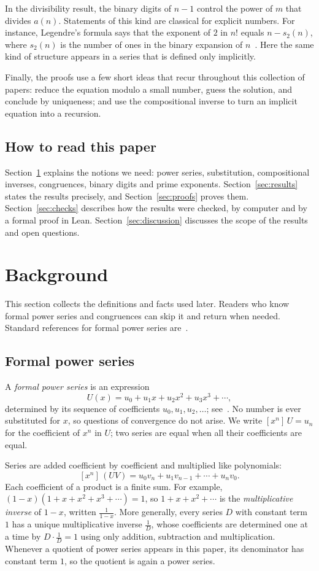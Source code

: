\documentclass[11pt,a4paper]{article}
\theoremstyle{definition}
\theoremstyle{remark}
\newcommand{\coeff}[2]{[x^{#1}]\,#2}
\begin{document}
In the divisibility result, the binary digits of $n-1$ control the power of $m$ that divides $a(n)$. Statements of
this kind are classical for explicit numbers. For instance, Legendre's formula says that the exponent of $2$
in $n!$ equals $n-s_2(n)$, where $s_2(n)$ is the number of ones in the binary expansion of $n$~\cite{concrete}.
Here the same kind of structure appears in a series that is defined only implicitly.

Finally, the proofs use a few short ideas that recur throughout this collection of papers: reduce the equation modulo
a small number, guess the solution, and conclude by uniqueness; and use the compositional inverse to turn an implicit
equation into a recursion.

\subsection{How to read this paper}
Section~\ref{sec:background} explains the notions we need: power series, substitution, compositional inverses,
congruences, binary digits and prime exponents. Section~\ref{sec:results} states the results precisely, and
Section~\ref{sec:proofs} proves them. Section~\ref{sec:checks} describes how the results were checked, by computer and by
a formal proof in Lean. Section~\ref{sec:discussion} discusses the scope of the results and open questions.
\section{Background}\label{sec:background}
This section collects the definitions and facts used later. Readers who know formal power series and congruences can skip it and return when needed. Standard references for formal power series are~\cite{niven,stanley}.
\subsection{Formal power series}
A \emph{formal power series} is an expression
\[
U(x)=u_0+u_1x+u_2x^2+u_3x^3+\cdots ,
\]
determined by its sequence of coefficients $u_0,u_1,u_2,\dots$; see~\cite{niven,stanley}. No number is ever
substituted for $x$, so questions of convergence do not arise. We write $\coeff{n}{U}=u_n$ for the coefficient of $x^n$ in $U$; two series are equal
when all their coefficients are equal.

Series are added coefficient by coefficient and multiplied like polynomials:
\[
\coeff{n}{(UV)}=u_0v_n+u_1v_{n-1}+\cdots+u_nv_0 .
\]
Each coefficient of a product is a finite sum. For example, $(1-x)(1+x+x^2+x^3+\cdots)=1$, so $1+x+x^2+\cdots$ is
the \emph{multiplicative inverse} of $1-x$, written $\frac{1}{1-x}$. More generally, every series $D$ with constant term
$1$ has a unique multiplicative inverse $\frac1D$, whose coefficients are determined one at a time by $D\cdot\frac1D=1$
using only addition, subtraction and multiplication. Whenever a quotient of power series appears in this paper, its
denominator has constant term $1$, so the quotient is again a power series.
\end{document}

